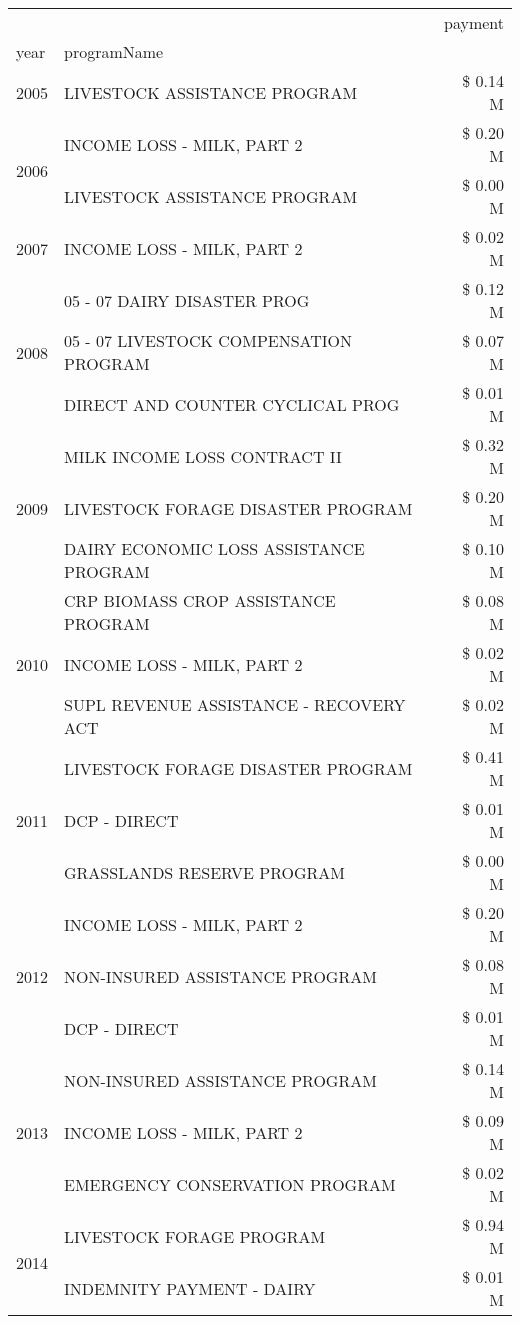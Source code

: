 \begin{tabular}{llr}
\toprule
 &  & payment \\
year & programName &  \\
\midrule
2005 & LIVESTOCK ASSISTANCE PROGRAM & \$ 0.14 M \\
\cline{1-3}
\multirow[t]{2}{*}{2006} & INCOME LOSS - MILK, PART 2 & \$ 0.20 M \\
 & LIVESTOCK ASSISTANCE PROGRAM & \$ 0.00 M \\
\cline{1-3}
2007 & INCOME LOSS - MILK, PART 2 & \$ 0.02 M \\
\cline{1-3}
\multirow[t]{3}{*}{2008} & 05 - 07 DAIRY DISASTER PROG & \$ 0.12 M \\
 & 05 - 07 LIVESTOCK COMPENSATION PROGRAM & \$ 0.07 M \\
 & DIRECT AND COUNTER CYCLICAL PROG & \$ 0.01 M \\
\cline{1-3}
\multirow[t]{3}{*}{2009} & MILK INCOME LOSS CONTRACT II & \$ 0.32 M \\
 & LIVESTOCK FORAGE DISASTER  PROGRAM & \$ 0.20 M \\
 & DAIRY ECONOMIC LOSS ASSISTANCE PROGRAM & \$ 0.10 M \\
\cline{1-3}
\multirow[t]{3}{*}{2010} & CRP BIOMASS CROP ASSISTANCE PROGRAM & \$ 0.08 M \\
 & INCOME LOSS - MILK, PART 2 & \$ 0.02 M \\
 & SUPL REVENUE ASSISTANCE - RECOVERY ACT & \$ 0.02 M \\
\cline{1-3}
\multirow[t]{3}{*}{2011} & LIVESTOCK FORAGE DISASTER PROGRAM & \$ 0.41 M \\
 & DCP - DIRECT & \$ 0.01 M \\
 & GRASSLANDS RESERVE PROGRAM & \$ 0.00 M \\
\cline{1-3}
\multirow[t]{3}{*}{2012} & INCOME LOSS - MILK, PART 2 & \$ 0.20 M \\
 & NON-INSURED ASSISTANCE PROGRAM & \$ 0.08 M \\
 & DCP - DIRECT & \$ 0.01 M \\
\cline{1-3}
\multirow[t]{3}{*}{2013} & NON-INSURED ASSISTANCE PROGRAM & \$ 0.14 M \\
 & INCOME LOSS - MILK, PART 2 & \$ 0.09 M \\
 & EMERGENCY CONSERVATION PROGRAM & \$ 0.02 M \\
\cline{1-3}
\multirow[t]{3}{*}{2014} & LIVESTOCK FORAGE PROGRAM & \$ 0.94 M \\
 & INDEMNITY PAYMENT - DAIRY & \$ 0.01 M \\

\end{tabular}
